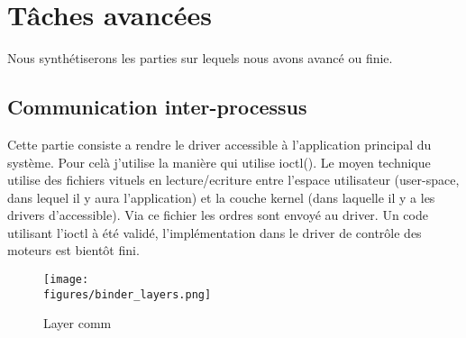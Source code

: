 \chapter{Tâches avancées}
\label{Chapter 3}

Nous synthétiserons les parties sur lequels nous avons avancé ou finie. 

\section{Communication inter-processus}

Cette partie consiste a rendre le driver accessible à l'application principal du système. Pour celà j'utilise la manière qui utilise ioctl(). Le moyen technique utilise des fichiers vituels en lecture/ecriture entre l'espace utilisateur (user-space, dans lequel il y aura l'application) et la couche kernel (dans laquelle il y a les drivers d'accessible). Via ce fichier les ordres sont envoyé au driver.
Un code utilisant l'ioctl à été validé, l'implémentation dans le driver de contrôle des moteurs est bientôt fini.

\begin{figure}[H]
    \centering
	\texttt{[image: \\figures/binder\_layers.png]}
    \decoRule
    \caption[
    Layer comm]{
    Layer comm}
    \label{fig:Schéma des couches lors de la communication app/driver}
    \end{figure}




